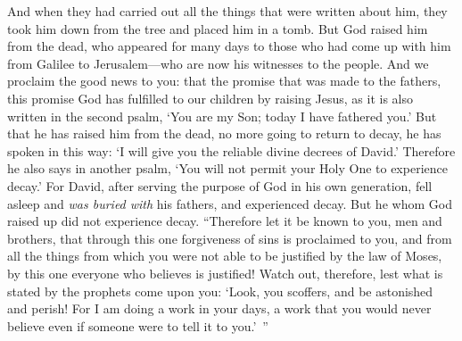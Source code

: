 \begin{biblechapter}
\verse And when they had carried out all the things that were written about him, they took him down from the tree and placed him in a tomb.
\verse But God raised him from the dead,
\verse who appeared for many days to those who had come up with him from Galilee to Jerusalem—who are now his witnesses to the people.
\verse And we proclaim the good news to you: that the promise that was made to the fathers,
\verse this promise God has fulfilled to our children by raising Jesus, as it is also written in the second psalm, ‘You are my Son; 
today I have fathered you.’
\verse But that he has raised him from the dead, no more going to return to decay, he has spoken in this way: ‘I will give you the reliable divine decrees of David.’
\verse Therefore he also says in another psalm, ‘You will not permit your Holy One to experience decay.’
\verse For David, after serving the purpose of God in his own generation, fell asleep and \textit{was buried with} his fathers, and experienced decay.
\verse But he whom God raised up did not experience decay.
\verse “Therefore let it be known to you, men and brothers, that through this one forgiveness of sins is proclaimed to you, and from all the things from which you were not able to be justified by the law of Moses,
\verse by this one everyone who believes is justified!
\verse Watch out, therefore, lest what is stated by the prophets come upon you:
\verse ‘Look, you scoffers, 
and be astonished and perish! 
For I am doing a work in your days, 
a work that you would never believe 
even if someone were to tell it to you.’ ”

\end{biblechapter}
